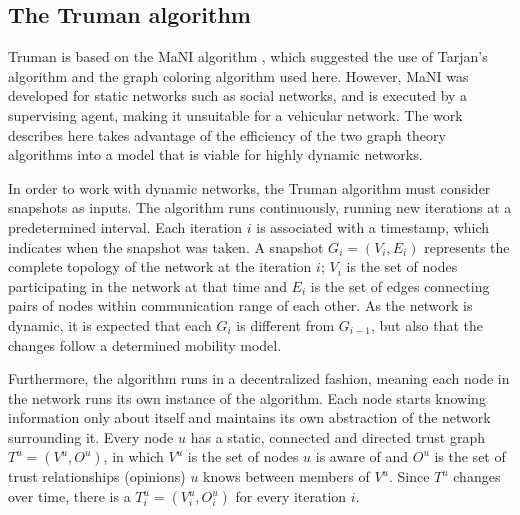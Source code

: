 \documentclass[conference]{IEEEtran}
\begin{document}
\subsection{The Truman algorithm}
\label{section:trustmanagement}


Truman is based on the MaNI algorithm \cite{vernize2015malicious}, which suggested the use of Tarjan's algorithm and the graph coloring algorithm used here.
However, MaNI was developed for static networks such as social networks, and is executed by a supervising agent, making it unsuitable for a vehicular network.
The work describes here takes advantage of the efficiency of the two graph theory algorithms into a model that is viable for highly dynamic networks.

In order to work with dynamic networks, the Truman algorithm must consider snapshots as inputs.
The algorithm runs continuously, running new iterations at a predetermined interval.
Each iteration $i$ is associated with a timestamp, which indicates when the snapshot was taken.
A snapshot $G_i = (V_i, E_i)$ represents the complete topology of the network at the iteration $i$; $V_i$ is the set of nodes participating in the network at that time and $E_i$ is the set of edges connecting pairs of nodes within communication range of each other.
As the network is dynamic, it is expected that each $G_i$ is different from $G_{i-1}$, but also that the changes follow a determined mobility model.

Furthermore, the algorithm runs in a decentralized fashion, meaning each node in the network runs its own instance of the algorithm.
Each node starts knowing information only about itself and maintains its own abstraction of the network surrounding it.
Every node $u$ has a static, connected and directed trust graph $T^u = (V^u, O^u)$, in which $V^u$ is the set of nodes $u$ is aware of and $O^u$ is the set of trust relationships (opinions) $u$ knows between members of $V^u$.
Since $T^u$ changes over time, there is a $T^u_i = (V^u_i, O^u_i)$ for every iteration $i$.
\end{document}
